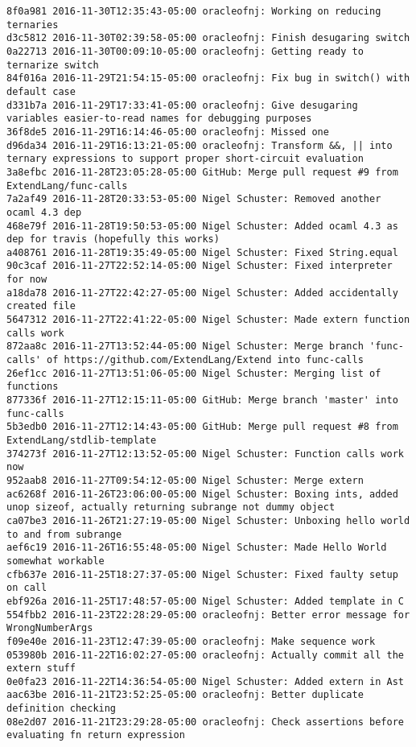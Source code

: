 \begin{lstlisting}
8f0a981 2016-11-30T12:35:43-05:00 oracleofnj: Working on reducing ternaries
d3c5812 2016-11-30T02:39:58-05:00 oracleofnj: Finish desugaring switch
0a22713 2016-11-30T00:09:10-05:00 oracleofnj: Getting ready to ternarize switch
84f016a 2016-11-29T21:54:15-05:00 oracleofnj: Fix bug in switch() with default case
d331b7a 2016-11-29T17:33:41-05:00 oracleofnj: Give desugaring variables easier-to-read names for debugging purposes
36f8de5 2016-11-29T16:14:46-05:00 oracleofnj: Missed one
d96da34 2016-11-29T16:13:21-05:00 oracleofnj: Transform &&, || into ternary expressions to support proper short-circuit evaluation
3a8efbc 2016-11-28T23:05:28-05:00 GitHub: Merge pull request #9 from ExtendLang/func-calls
7a2af49 2016-11-28T20:33:53-05:00 Nigel Schuster: Removed another ocaml 4.3 dep
468e79f 2016-11-28T19:50:53-05:00 Nigel Schuster: Added ocaml 4.3 as dep for travis (hopefully this works)
a408761 2016-11-28T19:35:49-05:00 Nigel Schuster: Fixed String.equal
90c3caf 2016-11-27T22:52:14-05:00 Nigel Schuster: Fixed interpreter for now
a18da78 2016-11-27T22:42:27-05:00 Nigel Schuster: Added accidentally created file
5647312 2016-11-27T22:41:22-05:00 Nigel Schuster: Made extern function calls work
872aa8c 2016-11-27T13:52:44-05:00 Nigel Schuster: Merge branch 'func-calls' of https://github.com/ExtendLang/Extend into func-calls
26ef1cc 2016-11-27T13:51:06-05:00 Nigel Schuster: Merging list of functions
877336f 2016-11-27T12:15:11-05:00 GitHub: Merge branch 'master' into func-calls
5b3edb0 2016-11-27T12:14:43-05:00 GitHub: Merge pull request #8 from ExtendLang/stdlib-template
374273f 2016-11-27T12:13:52-05:00 Nigel Schuster: Function calls work now
952aab8 2016-11-27T09:54:12-05:00 Nigel Schuster: Merge extern
ac6268f 2016-11-26T23:06:00-05:00 Nigel Schuster: Boxing ints, added unop sizeof, actually returning subrange not dummy object
ca07be3 2016-11-26T21:27:19-05:00 Nigel Schuster: Unboxing hello world to and from subrange
aef6c19 2016-11-26T16:55:48-05:00 Nigel Schuster: Made Hello World somewhat workable
cfb637e 2016-11-25T18:27:37-05:00 Nigel Schuster: Fixed faulty setup on call
ebf926a 2016-11-25T17:48:57-05:00 Nigel Schuster: Added template in C
554fbb2 2016-11-23T22:28:29-05:00 oracleofnj: Better error message for WrongNumberArgs
f09e40e 2016-11-23T12:47:39-05:00 oracleofnj: Make sequence work
053980b 2016-11-22T16:02:27-05:00 oracleofnj: Actually commit all the extern stuff
0e0fa23 2016-11-22T14:36:54-05:00 Nigel Schuster: Added extern in Ast
aac63be 2016-11-21T23:52:25-05:00 oracleofnj: Better duplicate definition checking
08e2d07 2016-11-21T23:29:28-05:00 oracleofnj: Check assertions before evaluating fn return expression

\end{lstlisting}
